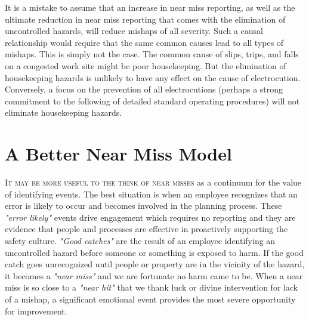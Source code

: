 \documentclass{tufte-handout}
\begin{document}
	It is a mistake to assume that an increase in near miss reporting, as well as the ultimate reduction in near miss reporting that comes with the elimination of uncontrolled hazards, will reduce mishaps of all severity.  Such a causal relationship would require that the same common causes lead to all types of mishaps.  This is simply not the case.  The common cause of slips, trips, and falls on a congested work site might be poor housekeeping.  But the elimination of housekeeping hazards is unlikely to have any effect on the cause of electrocution.  Conversely, a focus on the prevention of all electrocutions (perhaps a strong commitment to the following of detailed standard operating procedures) will not eliminate housekeeping hazards.
	
	\section{A Better Near Miss Model}\label{sec:BetterModel}
	
	\textsc{It may be more useful to the think of near misses}   as a continuum for the value of identifying events.  The best situation is when an employee recognizes that an error is likely to occur and becomes involved in the planning process.  These \textit{"error likely"} events drive engagement which requires no reporting and they are evidence that people and processes are effective in proactively supporting the safety culture.  \textit{"Good catches"} are the result of an employee identifying an uncontrolled hazard before someone or something is exposed to harm.  If the good catch goes unrecognized until people or property are in the vicinity of the hazard, it becomes a \textit{"near miss"} and we are fortunate no harm came to be.  When a near miss is so close to a \textit{"near hit"} that we thank luck or divine intervention for lack of a mishap, a significant emotional event provides the most severe opportunity for improvement.
	
\end{document}
